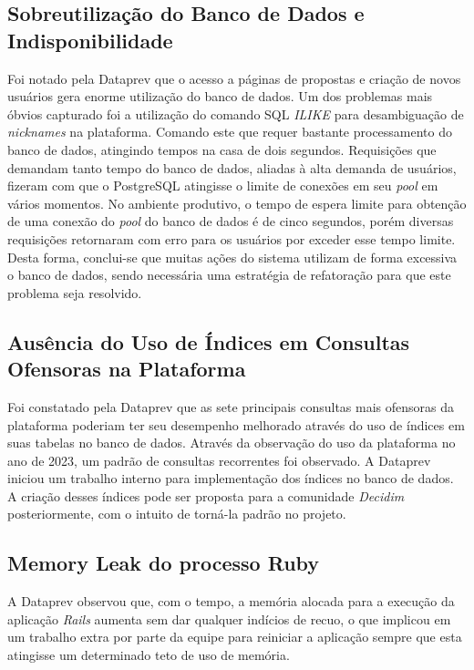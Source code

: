 \subsection{Sobreutilização do Banco de Dados e Indisponibilidade}

Foi notado pela Dataprev que o acesso a páginas de propostas e criação de novos usuários gera enorme utilização do banco de dados. Um dos problemas mais óbvios capturado foi a utilização do comando SQL \textit{ILIKE} para desambiguação de \textit{nicknames} na plataforma. Comando este que requer bastante processamento do banco de dados, atingindo tempos na casa de dois segundos. Requisições que demandam tanto tempo do banco de dados, aliadas à alta demanda de usuários, fizeram com que o PostgreSQL atingisse o limite de conexões em seu \textit{pool} em vários momentos. No ambiente produtivo, o tempo de espera limite para obtenção de uma conexão do \textit{pool} do banco de dados é de cinco segundos, porém diversas requisições retornaram com erro para os usuários por exceder esse tempo limite. Desta forma, conclui-se que muitas ações do sistema utilizam de forma excessiva o banco de dados, sendo necessária uma estratégia de refatoração para que este problema seja resolvido.

\subsection{Ausência do Uso de Índices em Consultas Ofensoras na Plataforma}

Foi constatado pela Dataprev que as sete principais consultas mais ofensoras da plataforma poderiam ter seu desempenho melhorado através do uso de índices em suas tabelas no banco de dados. Através da observação do uso da plataforma no ano de 2023, um padrão de consultas recorrentes foi observado. A Dataprev iniciou um trabalho interno para implementação dos índices no banco de dados. A criação desses índices pode ser proposta para a comunidade \textit{Decidim} posteriormente, com o intuito de torná-la padrão no projeto.

\subsection{Memory Leak do processo Ruby}

A Dataprev observou que, com o tempo, a memória alocada para a execução da aplicação \textit{Rails} aumenta sem dar qualquer indícios de recuo, o que implicou em um trabalho extra por parte da equipe para reiniciar a aplicação sempre que esta atingisse um determinado teto de uso de memória.


